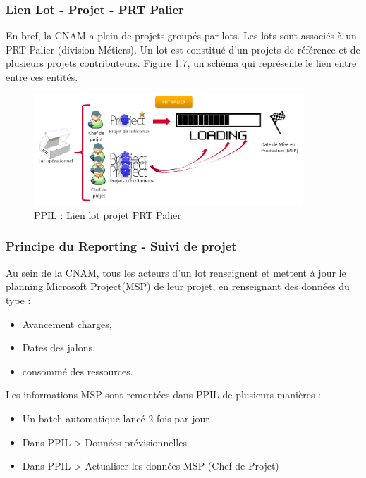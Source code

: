 \subsubsection{Lien Lot - Projet - PRT Palier}

En bref, la CNAM a plein de projets groupés par lots. Les lots sont associés à un PRT Palier (division Métiers). Un lot est constitué d'un projets de référence et de plusieurs projets contributeurs. Figure 1.7, un schéma qui représente le lien entre entre ces entités.

\begin{figure}[!h]
\centering
\includegraphics[width=0.9\textwidth]{images/ppil-lien-lot-projet-prtpalier.png}
\caption{PPIL : Lien lot projet PRT Palier}
\end{figure}

\subsubsection{Principe du Reporting - Suivi de projet}

Au sein de la CNAM, tous les acteurs d’un lot renseignent et mettent à jour le planning Microsoft Project(MSP) de leur projet, en renseignant des données du type :

\vspace{1\baselineskip}

\begin{itemize}
    \item Avancement charges, 
    \item Dates des jalons, 
    \item consommé des ressources.
\end{itemize}

\vspace{1\baselineskip}

Les informations MSP sont remontées dans PPIL de plusieurs manières :
\begin{itemize}
    \item Un batch automatique lancé 2 fois par jour
    \item Dans PPIL > Données prévisionnelles
    \item Dans PPIL > Actualiser les données MSP (Chef de Projet)
\end{itemize}

